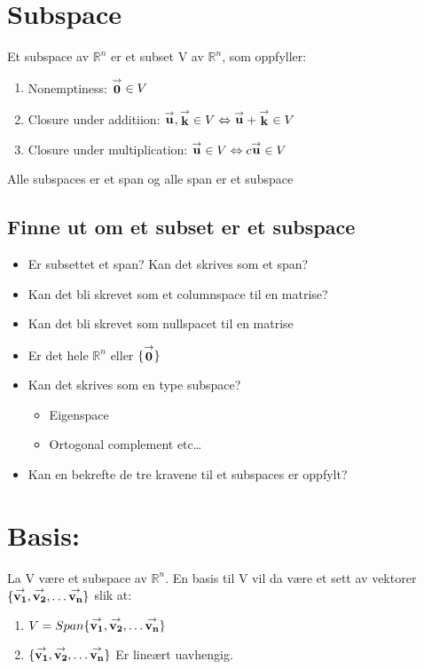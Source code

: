 \documentclass[12pt,a4paper,twocolumn,twoside]{article}
\def\real{\mathbb{R}}
\def\vector#1{\bold{\stackrel{\rightarrow}{#1}}}
\begin{document}
%
%
\section*{Subspace}
Et subspace av $\real^n$ er et subset V av $\real^n$, som oppfyller:
\begin{enumerate}[topsep=0pt,itemsep=0pt, partopsep=0pt]
    \item Nonemptiness: $\vector{0}\in V$
    \item Closure under additiion: $\vector{u},\vector{k}\in V \Leftrightarrow \vector{u}+\vector{k}\in V$
    \item Closure under multiplication: $\vector{u}\in V \Leftrightarrow c\vector{u}\in V$
\end{enumerate}
Alle subspaces er et span og alle span er et subspace
\subsection*{Finne ut om et subset er et subspace}
\begin{itemize}[topsep=0pt,itemsep=0pt, partopsep=0pt]
    \item Er subsettet et span? Kan det skrives som et span?
    \item Kan det bli skrevet som et columnspace til en matrise?
    \item Kan det bli skrevet som nullspacet til en matrise
    \item Er det hele $\real^n$ eller $\{\vector{0}\}$
    \item Kan det skrives som en type subspace?\\
    \begin{itemize}[topsep=0pt,itemsep=0pt, partopsep=0pt]
        \item Eigenspace
        \item Ortogonal complement etc\dots
    \end{itemize}
    \item Kan en bekrefte de tre kravene til et subspaces er oppfylt?
\end{itemize}
\section*{Basis:}
La V være et subspace av $\real^n$. En basis til V vil da være et sett av
vektorer $\{\vector{v_1},\vector{v_2},\dots\vector{v_n}\}$ slik at:
\begin{enumerate}[topsep=0pt,itemsep=0pt, partopsep=0pt]
    \item $V = Span\{\vector{v_1},\vector{v_2},\dots\vector{v_n}\}$
    \item $\{\vector{v_1},\vector{v_2},\dots\vector{v_n}\}$ Er lineært uavhengig.
\end{enumerate}
\end{document}
